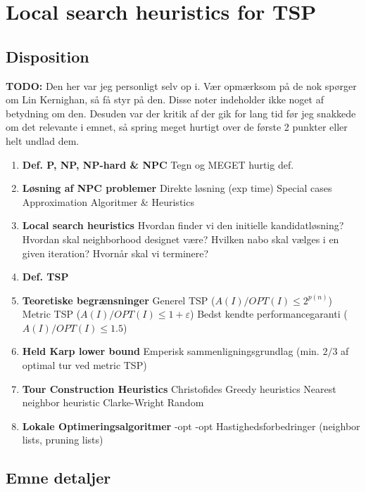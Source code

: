 \section{Local search heuristics for TSP}

\subsection{Disposition}

\textbf{TODO: } Den her var jeg personligt selv op i. Vær opmærksom på de nok spørger om Lin Kernighan, så få styr på den. Disse noter indeholder ikke noget af betydning om den. Desuden var der kritik af der gik for lang tid før jeg snakkede om det relevante i emnet, så spring meget hurtigt over de første 2 punkter eller helt undlad dem. 

\begin{enumerate}
 \item \textbf{Def. P, NP, NP-hard \& NPC}
    \subitem  Tegn og MEGET hurtig def.
 \item \textbf{Løsning af NPC problemer}
    \subitem Direkte løsning (exp time)
    \subitem Special cases
    \subitem Approximation Algoritmer \& Heuristics
  \item \textbf{Local search heuristics}
    \subitem Hvordan finder vi den initielle kandidatløsning?
    \subitem Hvordan skal neighborhood designet være?
    \subitem Hvilken nabo skal vælges i en given iteration?
    \subitem Hvornår skal vi terminere?
 \item \textbf{Def. TSP}
 \item \textbf{Teoretiske begrænsninger}
    \subitem Generel TSP ($A(I)/OPT(I) \leq 2^{p(n)}$)
    \subitem Metric TSP ($A(I)/OPT(I) \leq 1+\varepsilon$)
    \subitem Bedst kendte performancegaranti ($A(I)/OPT(I) \leq 1.5$)
 \item \textbf{Held Karp lower bound}
    \subitem Emperisk sammenligningsgrundlag (min. $2/3$ af optimal tur ved metric TSP)
 \item \textbf{Tour Construction Heuristics}
    \subitem Christofides
    \subitem Greedy heuristics
    \subitem Nearest neighbor heuristic
    \subitem Clarke-Wright
    \subitem Random
 \item \textbf{Lokale Optimeringsalgoritmer}
    -opt
    -opt
    \subitem Hastighedsforbedringer (neighbor lists, pruning lists)
\end{enumerate}

\subsection{Emne detaljer}

